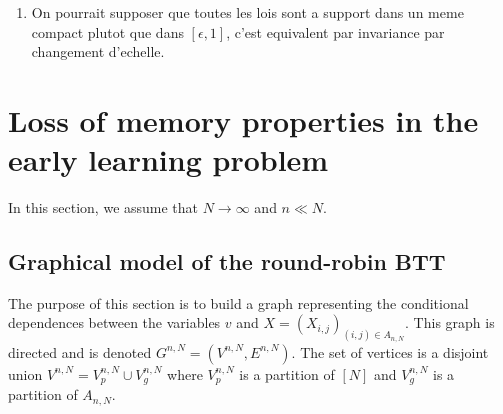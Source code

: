 \begin{enumerate}
\item On pourrait supposer que toutes les lois sont a support dans un meme compact plutot que dans $[\epsilon,1]$, c'est equivalent par invariance par changement d'echelle.
\end{enumerate}

\section{Loss of memory properties in the early learning problem}

In this section, we assume that $N\to\infty$ and $n\ll N$.

\subsection{Graphical model of the round-robin BTT}
The purpose of this section is to build a graph representing the conditional dependences between the variables $v$ and $X=(X_{i,j})_{(i,j)\in A_{n,N}}$. This graph is directed and is denoted $G^{n,N}=(V^{n,N},E^{n,N})$. The set of vertices is a disjoint union $V^{n,N}=V^{n,N}_{p}\cup V^{n,N}_g$ where $V^{n,N}_p$ is a partition of $[N]$ and $V^{n,N}_g$ is a partition of $ A_{n,N}$. 

